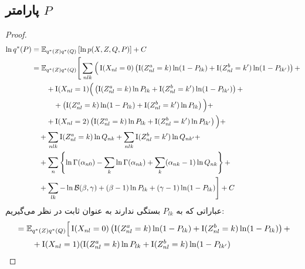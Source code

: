 




\newpage
\subsection{پارامتر
$P$}

\begin{proof}
\begin{align*}
\ln \StarProb{P} &= \Exp{\StarProb{Z} \StarProb{Q}}{\ln \TrueProb{X, Z, Q, P}} + C
\\ %
	&= \mathbb{E}_{\StarProb{Z} \StarProb{Q}} \Bigg[ \sum_{nlk} \Big( \Big.
		\Indic{X_{nl} = 0} \left( \Indic{Z_{nl}^a = k} \ln (1 - P_{lk})
				+ \Indic{Z_{nl}^b = k'} \ln (1 - P_{lk'}) \right) +												\nonumber \\
			& \qquad + \Indic{X_{nl} = 1} \Big(
				\left( \Indic{Z_{nl}^a=k} \ln P_{lk} + \Indic{Z_{nl}^b=k'} \ln (1 - P_{lk'}) \right) +			\nonumber \\
			& \qquad \quad + \left( \Indic{Z_{nl}^a=k} \ln (1 - P_{lk}) + \Indic{Z_{nl}^b=k'} \ln P_{lk} \right)
			\Big) +																								\nonumber \\
			& \qquad + \Indic{X_{nl} = 2} \left( \Indic{Z_{nl}^a = k} \ln P_{lk}
				+ \Indic{Z_{nl}^b = k'} \ln P_{lk'} \right)
	\Big. \Big) +
\nonumber \\ %
		& \quad + \sum_{nlk} \Indic{Z_{nl}^a = k} \ln Q_{nk}
			+ \sum_{nlk} \Indic{Z_{nl}^b = k'} \ln Q_{nk'} +
\nonumber \\ %
		& \quad + \sum_n \left\{
			\ln \GammaFunc{\alpha_{n0}}
			- \sum_{k} \ln \GammaFunc{\alpha_{nk}}
			+ \sum_{k} (\alpha_{nk} - 1) \ln Q_{nk}
		\right\} +
\nonumber \\ %
		& \quad + \sum_{lk} - \ln \BetaFunc{\beta}{\gamma}
		+ (\beta - 1) \ln P_{lk}
		+ (\gamma - 1) \ln (1 - P_{lk})
	\Bigg] + C
\end{align*}
عباراتی که به
$P_{lk}$
بستگی ندارند به عنوان ثابت در نظر می‌گیریم:
\begin{align*}
	&= \mathbb{E}_{\StarProb{Z} \StarProb{Q}} \Big[
		\Indic{X_{nl} = 0} \left( \Indic{Z_{nl}^a = k} \ln (1 - P_{lk}) + \Indic{Z_{nl}^b=k} \ln (1 - P_{lk}) \right) +			\nonumber \\
		& \qquad + \Indic{X_{nl}=1} (\Indic{Z_{nl}^a=k} \ln P_{lk} + \Indic{Z_{nl}^b=k} \ln (1 - P_{lk'})			\\

\end{align*}
\end{proof}
